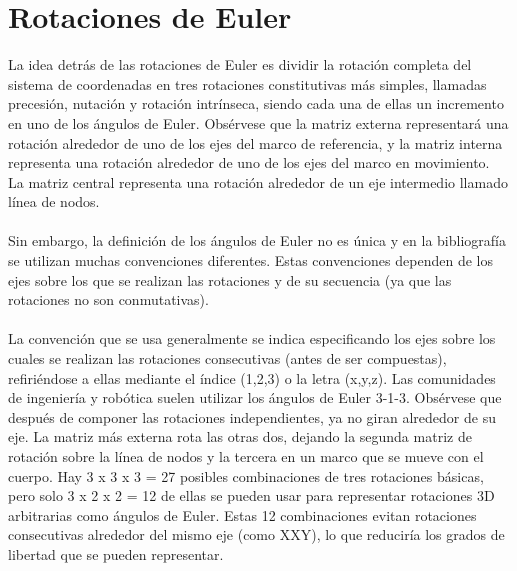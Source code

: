 \documentclass[12pt,a4paper]{article}
\begin{document}
\section{Rotaciones de Euler}
La idea detrás de las rotaciones de Euler es dividir la rotación completa del sistema de coordenadas en tres rotaciones constitutivas más simples, llamadas precesión, nutación y rotación intrínseca, siendo cada una de ellas un incremento en uno de los ángulos de Euler. Obsérvese que la matriz externa representará una rotación alrededor de uno de los ejes del marco de referencia, y la matriz interna representa una rotación alrededor de uno de los ejes del marco en movimiento. \\La matriz central representa una rotación alrededor de un eje intermedio llamado línea de nodos.\\\\

Sin embargo, la definición de los ángulos de Euler no es única y en la bibliografía se utilizan muchas convenciones diferentes. Estas convenciones dependen de los ejes sobre los que se realizan las rotaciones y de su secuencia (ya que las rotaciones no son conmutativas).\\\\

La convención que se usa generalmente se indica especificando los ejes sobre los cuales se realizan las rotaciones consecutivas (antes de ser compuestas), refiriéndose a ellas mediante el índice (1,2,3) o la letra (x,y,z). Las comunidades de ingeniería y robótica suelen utilizar los ángulos de Euler 3-1-3. Obsérvese que después de componer las rotaciones independientes, ya no giran alrededor de su eje. La matriz más externa rota las otras dos, dejando la segunda matriz de rotación sobre la línea de nodos y la tercera en un marco que se mueve con el cuerpo. Hay 3 x 3 x 3 = 27 posibles combinaciones de tres rotaciones básicas, pero solo 3 x 2 x 2 = 12 de ellas se pueden usar para representar rotaciones 3D arbitrarias como ángulos de Euler. Estas 12 combinaciones evitan rotaciones consecutivas alrededor del mismo eje (como XXY), lo que reduciría los grados de libertad que se pueden representar.\\\\
\end{document}

